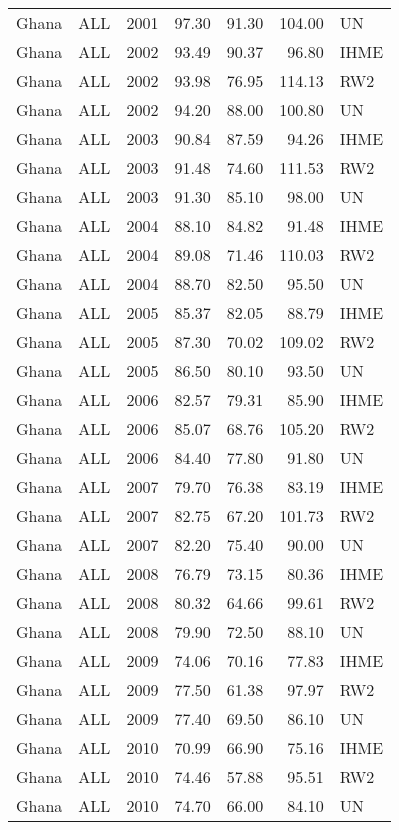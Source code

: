 \begin{longtable}{lllrrrl}
  Ghana & ALL & 2001 & 97.30 & 91.30 & 104.00 & UN \\ 
  Ghana & ALL & 2002 & 93.49 & 90.37 & 96.80 & IHME \\ 
  Ghana & ALL & 2002 & 93.98 & 76.95 & 114.13 & RW2 \\ 
  Ghana & ALL & 2002 & 94.20 & 88.00 & 100.80 & UN \\ 
  Ghana & ALL & 2003 & 90.84 & 87.59 & 94.26 & IHME \\ 
  Ghana & ALL & 2003 & 91.48 & 74.60 & 111.53 & RW2 \\ 
  Ghana & ALL & 2003 & 91.30 & 85.10 & 98.00 & UN \\ 
  Ghana & ALL & 2004 & 88.10 & 84.82 & 91.48 & IHME \\ 
  Ghana & ALL & 2004 & 89.08 & 71.46 & 110.03 & RW2 \\ 
  Ghana & ALL & 2004 & 88.70 & 82.50 & 95.50 & UN \\ 
  Ghana & ALL & 2005 & 85.37 & 82.05 & 88.79 & IHME \\ 
  Ghana & ALL & 2005 & 87.30 & 70.02 & 109.02 & RW2 \\ 
  Ghana & ALL & 2005 & 86.50 & 80.10 & 93.50 & UN \\ 
  Ghana & ALL & 2006 & 82.57 & 79.31 & 85.90 & IHME \\ 
  Ghana & ALL & 2006 & 85.07 & 68.76 & 105.20 & RW2 \\ 
  Ghana & ALL & 2006 & 84.40 & 77.80 & 91.80 & UN \\ 
  Ghana & ALL & 2007 & 79.70 & 76.38 & 83.19 & IHME \\ 
  Ghana & ALL & 2007 & 82.75 & 67.20 & 101.73 & RW2 \\ 
  Ghana & ALL & 2007 & 82.20 & 75.40 & 90.00 & UN \\ 
  Ghana & ALL & 2008 & 76.79 & 73.15 & 80.36 & IHME \\ 
  Ghana & ALL & 2008 & 80.32 & 64.66 & 99.61 & RW2 \\ 
  Ghana & ALL & 2008 & 79.90 & 72.50 & 88.10 & UN \\ 
  Ghana & ALL & 2009 & 74.06 & 70.16 & 77.83 & IHME \\ 
  Ghana & ALL & 2009 & 77.50 & 61.38 & 97.97 & RW2 \\ 
  Ghana & ALL & 2009 & 77.40 & 69.50 & 86.10 & UN \\ 
  Ghana & ALL & 2010 & 70.99 & 66.90 & 75.16 & IHME \\ 
  Ghana & ALL & 2010 & 74.46 & 57.88 & 95.51 & RW2 \\ 
  Ghana & ALL & 2010 & 74.70 & 66.00 & 84.10 & UN \\ 

\end{longtable}
